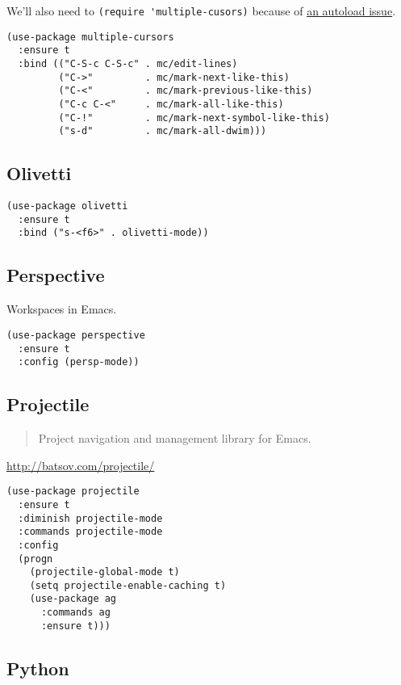\documentclass[11pt]{article}
\begin{document}
We'll also need to \verb~(require 'multiple-cusors)~ because of \href{https://github.com/magnars/multiple-cursors.el/issues/105}{an autoload issue}.

\begin{verbatim}
(use-package multiple-cursors
  :ensure t
  :bind (("C-S-c C-S-c" . mc/edit-lines)
         ("C->"         . mc/mark-next-like-this)
         ("C-<"         . mc/mark-previous-like-this)
         ("C-c C-<"     . mc/mark-all-like-this)
         ("C-!"         . mc/mark-next-symbol-like-this)
         ("s-d"         . mc/mark-all-dwim)))
\end{verbatim}

\subsection{Olivetti}
\label{sec-18-21}

\begin{verbatim}
(use-package olivetti
  :ensure t
  :bind ("s-<f6>" . olivetti-mode))
\end{verbatim}

\subsection{Perspective}
\label{sec-18-22}

Workspaces in Emacs.

\begin{verbatim}
(use-package perspective
  :ensure t
  :config (persp-mode))
\end{verbatim}

\subsection{Projectile}
\label{sec-18-23}

\begin{quote}
Project navigation and management library for Emacs.
\end{quote}
\url{http://batsov.com/projectile/}


\begin{verbatim}
(use-package projectile
  :ensure t
  :diminish projectile-mode
  :commands projectile-mode
  :config
  (progn
    (projectile-global-mode t)
    (setq projectile-enable-caching t)
    (use-package ag
      :commands ag
      :ensure t)))
\end{verbatim}

\subsection{Python}
\label{sec-18-24}
\end{document}
